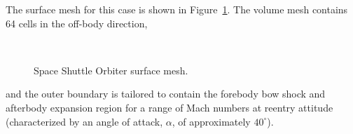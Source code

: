 The surface mesh for this case is shown in Figure~\ref{fig:orbiter_schematic_mesh}.  The volume mesh contains 64 cells in the off-body direction,
\begin{figure}[hbtp]
  \begin{center}
     \\
    \caption{Space Shuttle Orbiter surface mesh.\label{fig:orbiter_schematic_mesh}}
  \end{center}
\end{figure}
and the outer boundary is tailored to contain the forebody bow shock and afterbody expansion region for a range of Mach numbers at reentry attitude (characterized by an angle of attack, $\alpha$, of approximately $40^\circ$).
  
